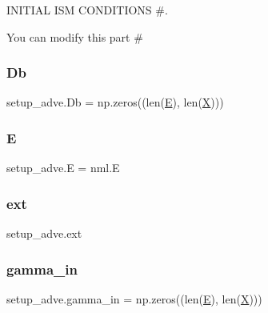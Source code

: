 I\+N\+I\+T\+I\+AL I\+SM C\+O\+N\+D\+I\+T\+I\+O\+NS \#. 

You can modify this part \# \mbox{\label{namespacesetup__adve_abfa5cf21753a9230187605c7ed5d2f99}} 
\subsubsection{\texorpdfstring{Db}{Db}}
{\footnotesize\ttfamily setup\+\_\+adve.\+Db = np.\+zeros((len(\hyperlink{namespacesetup__adve_a924af0e190ae028ed71b0d7b9dd75fed}{E}), len(\hyperlink{namespacesetup__adve_ac58005e2708a29ed334e0542dd68d336}{X})))}

\mbox{\label{namespacesetup__adve_a924af0e190ae028ed71b0d7b9dd75fed}} 
\subsubsection{\texorpdfstring{E}{E}}
{\footnotesize\ttfamily setup\+\_\+adve.\+E = nml.\+E}

\mbox{\label{namespacesetup__adve_a39a1b244b07d8a98961c220d41ca6d69}} 
\subsubsection{\texorpdfstring{ext}{ext}}
{\footnotesize\ttfamily setup\+\_\+adve.\+ext}

\mbox{\label{namespacesetup__adve_a090a7806f07ab891a61c857e3bbfdf08}} 
\subsubsection{\texorpdfstring{gamma\+\_\+in}{gamma\_in}}
{\footnotesize\ttfamily setup\+\_\+adve.\+gamma\+\_\+in = np.\+zeros((len(\hyperlink{namespacesetup__adve_a924af0e190ae028ed71b0d7b9dd75fed}{E}), len(\hyperlink{namespacesetup__adve_ac58005e2708a29ed334e0542dd68d336}{X})))}

